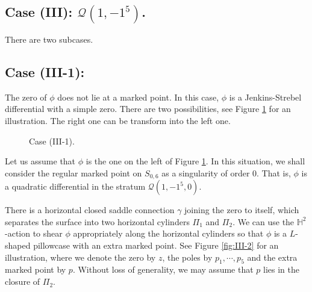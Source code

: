 \documentclass[11pt]{amsart}
\theoremstyle{plain}
\newcommand{\Q}{\mathcal{Q}}
\begin{document}
\subsection{Case (III): $\Q(1, -1^5)$.}\label{Case-III}
There are two subcases.

\subsection*{Case (III-1):} The zero of $\phi$ does not lie at a marked point. 
In this case, $\phi$ is a Jenkins-Strebel differential with a simple zero. There are two  possibilities, see Figure \ref{fig:III-1} for an illustration. The right one can be transform into the left one.

\begin{figure}[h]
\centering

\caption{Case (III-1).}
\label{fig:III-1}
\end{figure}


Let us assume that $\phi$ is the one on the left of Figure \ref{fig:III-1}.
In this situation, we shall consider the regular marked point on $S_{0,6}$ as a singularity of order $0$. That is,  $\phi$ is a quadratic differential in the stratum 
$\Q(1, -1^5, 0)$. 

There is a horizontal closed saddle connection $\gamma$ joining the zero to itself,
which separates the surface into two horizontal cylinders $\Pi_1$ and $\Pi_2$.  
We can use the $\mathbb{H}^2$-action to shear $\phi$ appropriately along the horizontal cylinders so that $\phi$ is a $L$-shaped pillowcase  with an extra marked point. See Figure \ref{fig:III-2} for an illustration, where we denote the zero by $z$, the poles by $p_1, \cdots, p_5$ and the extra marked point by $p$. 
Without loss of generality, we may assume that $p$ lies in the closure of $\Pi_2$.
\end{document}
